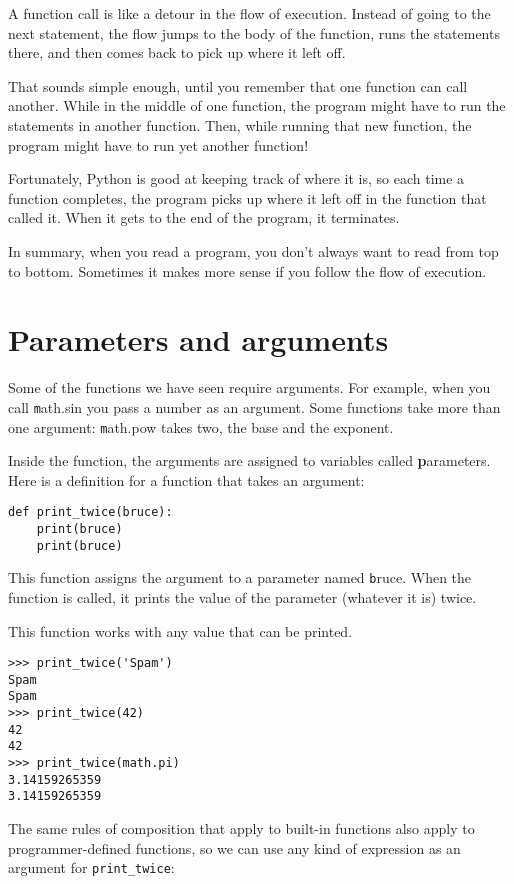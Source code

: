 \documentclass[
DIV=11,
fontsize=12,
twoside,
headinclude=false,
titlepage=firstiscover,
abstract=true,
headsepline=true,
footsepline=true,
chapterprefix=true, %
headings=big,
bibliography=totoc,%
captions=tableheading
]{scrbook}
\theoremstyle{definition}
\begin{document}
A function call is like a detour in the flow of execution. Instead of
going to the next statement, the flow jumps to the body of
the function, runs the statements there, and then comes back
to pick up where it left off.

That sounds simple enough, until you remember that one function can
call another.  While in the middle of one function, the program might
have to run the statements in another function.  Then, while
running that new function, the program might have to run yet
another function!

Fortunately, Python is good at keeping track of where it is, so each
time a function completes, the program picks up where it left off in
the function that called it.  When it gets to the end of the program,
it terminates.

In summary, when you read a program, you
don't always want to read from top to bottom.  Sometimes it makes
more sense if you follow the flow of execution.


\section{Parameters and arguments}
\label{parameters}

Some of the functions we have seen require arguments.  For
example, when you call {\texttt math.sin} you pass a number
as an argument.  Some functions take more than one argument:
{\texttt math.pow} takes two, the base and the exponent.

Inside the function, the arguments are assigned to
variables called {\textbf parameters}.  Here is a definition for
a function that takes an argument:

\begin{lstlisting}
def print_twice(bruce):
    print(bruce)
    print(bruce)
\end{lstlisting}
%
This function assigns the argument to a parameter
named {\texttt bruce}.  When the function is called, it prints the value of
the parameter (whatever it is) twice.

This function works with any value that can be printed.

\begin{lstlisting}
>>> print_twice('Spam')
Spam
Spam
>>> print_twice(42)
42
42
>>> print_twice(math.pi)
3.14159265359
3.14159265359
\end{lstlisting}
%
The same rules of composition that apply to built-in functions also
apply to programmer-defined functions, so we can use any kind of expression
as an argument for \verb"print_twice":
\end{document}
